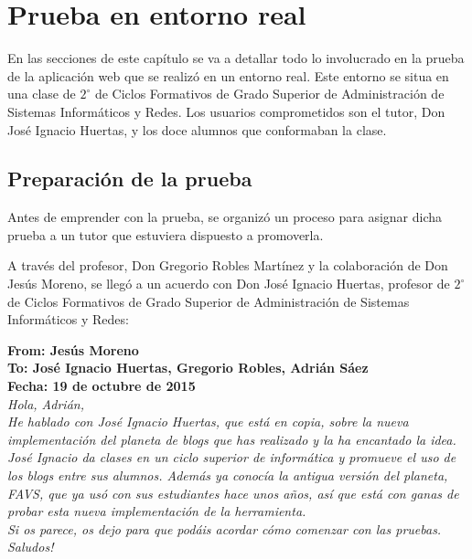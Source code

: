 \documentclass[a4paper, 12pt]{book}
\begin{document}

\cleardoublepage
\chapter{Prueba en entorno real}
\label{chap:prueba}
En las secciones de este cap\'itulo se va a detallar todo lo involucrado en la prueba de la aplicaci\'on web que se realiz\'o en un entorno real. Este 
entorno se situa en una clase de $2^\circ$ de Ciclos Formativos de Grado Superior de Administraci\'on de Sistemas Inform\'aticos y Redes. Los usuarios 
comprometidos son el tutor, Don Jos\'e Ignacio Huertas, y los doce alumnos que conformaban la clase.

\section{Preparaci\'on de la prueba}
\label{seccion:preparacionprueba}
Antes de emprender con la prueba, se organiz\'o un proceso para asignar dicha prueba a un tutor que estuviera dispuesto a promoverla.

A trav\'es del profesor, Don Gregorio Robles Mart\'inez y la colaboraci\'on de Don Jes\'us Moreno, se lleg\'o a un acuerdo con Don Jos\'e 
Ignacio Huertas, profesor de $2^\circ$ de Ciclos Formativos de Grado Superior de Administraci\'on de Sistemas Inform\'aticos y Redes:

\begin{shaded}
\noindent\textbf{\textsf{
From: Jes\'us Moreno\\
To: Jos\'e Ignacio Huertas, Gregorio Robles, Adri\'an S\'aez\\
Fecha: 19 de octubre de 2015\\
}}
\emph{
Hola, Adri\'an,\\
He hablado con Jos\'e Ignacio Huertas, que est\'a en copia, sobre la nueva implementaci\'on del planeta de blogs que has realizado y la ha 
encantado la idea. \\
Jos\'e Ignacio da clases en un ciclo superior de inform\'atica y promueve el uso de los blogs entre sus alumnos. Adem\'as ya conoc\'ia la 
antigua versi\'on del planeta, FAVS, que ya us\'o con sus estudiantes hace unos a\~nos, as\'i que est\'a con ganas de probar esta nueva 
implementaci\'on de la herramienta.\\
Si os parece, os dejo para que pod\'ais acordar c\'omo comenzar con las pruebas.\\
Saludos!
}
\end{shaded}
\end{document}
